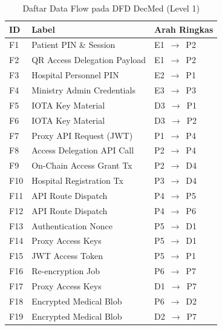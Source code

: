\documentclass[bahasa, 12pt, a4paper, onecolumn, oneside, final]{report}
\begin{document}
\begin{table}[!ht]
	\centering
	\caption{Daftar Data Flow pada DFD DecMed (Level 1)}
	\label{tab:dfd-dataflow-level-1}
	\small
	\begin{tabular}{|p{}|p{}|p{}|}
		\hline
		\textbf{ID} & \textbf{Label}               & \textbf{Arah Ringkas} \\ \hline
		F1          & Patient PIN \& Session       & E1~$\rightarrow$~P2   \\ \hline
		F2          & QR Access Delegation Payload & E1~$\rightarrow$~P2   \\ \hline
		F3          & Hospital Personnel PIN       & E2~$\rightarrow$~P1   \\ \hline
		F4          & Ministry Admin Credentials   & E3~$\rightarrow$~P3   \\ \hline
		F5          & IOTA Key Material            & D3~$\rightarrow$~P1   \\ \hline
		F6          & IOTA Key Material            & D3~$\rightarrow$~P2   \\ \hline
		F7          & Proxy API Request (JWT)      & P1~$\rightarrow$~P4   \\ \hline
		F8          & Access Delegation API Call   & P2~$\rightarrow$~P4   \\ \hline
		F9          & On-Chain Access Grant Tx     & P2~$\rightarrow$~D4   \\ \hline
		F10         & Hospital Registration Tx     & P3~$\rightarrow$~D4   \\ \hline
		F11         & API Route Dispatch           & P4~$\rightarrow$~P5   \\ \hline
		F12         & API Route Dispatch           & P4~$\rightarrow$~P6   \\ \hline
		F13         & Authentication Nonce         & P5~$\rightarrow$~D1   \\ \hline
		F14         & Proxy Access Keys            & P5~$\rightarrow$~D1   \\ \hline
		F15         & JWT Access Token             & P5~$\rightarrow$~P1   \\ \hline
		F16         & Re-encryption Job            & P6~$\rightarrow$~P7   \\ \hline
		F17         & Proxy Access Keys            & D1~$\rightarrow$~P7   \\ \hline
		F18         & Encrypted Medical Blob       & P6~$\rightarrow$~D2   \\ \hline
		F19         & Encrypted Medical Blob       & D2~$\rightarrow$~P7   \\ \hline

\end{tabular}
\end{table}
\end{document}
